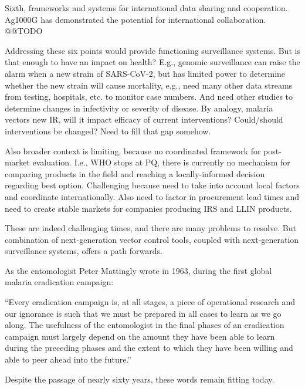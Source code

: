 \documentclass[a4paper,11pt,abstracton,hidelinks]{scrartcl}
\begin{document}
Sixth, frameworks and systems for international data sharing and cooperation.
%
Ag1000G has demonstrated the potential for international collaboration.
%
@@TODO


Addressing these six points would provide functioning surveillance systems.
%
But is that enough to have an impact on health?
%
E.g., genomic surveillance can raise the alarm when a new strain of SARS-CoV-2, but has limited power to determine whether the new strain will cause mortality, e.g., need many other data streams from testing, hospitals, etc. to monitor case numbers. And need other studies to determine changes in infectivity or severity of disease.
%
By analogy, malaria vectors new IR, will it impact efficacy of current interventions? Could/should interventions be changed? Need to fill that gap somehow.


Also broader context is limiting, because no coordinated framework for post-market evaluation.
%
I.e., WHO stops at PQ, there is currently no mechanism for comparing products in the field and reaching a locally-informed decision regarding best option.
%
Challenging because need to take into account local factors and coordinate internationally.
%
Also need to factor in procurement lead times and need to create stable markets for companies producing IRS and LLIN products.


These are indeed challenging times, and there are many problems to resolve. But combination of next-generation vector control tools, coupled with next-generation surveillance systems, offers a path forwards.


As the entomologist Peter Mattingly wrote in 1963, during the first global malaria eradication campaign:


\begin{displayquote}
``Every eradication campaign is, at all stages, a piece of operational research and our ignorance is such that we must be prepared in all cases to learn as we go along. The usefulness of the entomologist in the final phases of an eradication campaign must largely depend on the amount they have been able to learn during the preceding phases and the extent to which they have been willing and able to peer ahead into the future.''
\end{displayquote}


Despite the passage of nearly sixty years, these words remain fitting today.


\printbibliography
\end{document}
